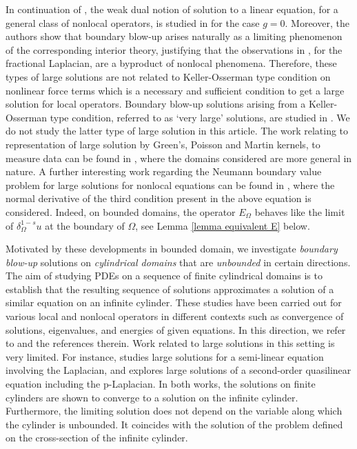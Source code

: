 \documentclass{amsart}
\begin{document}
In continuation of \cite{Abatangelo2015LargesHarmonic}, the weak dual notion of solution to a linear equation, for a general class of nonlocal operators, is studied in \cite{AbatangeloVazquez2023} for the case $g=0$. Moreover, the authors show that boundary blow-up arises naturally as a limiting phenomenon of the corresponding interior theory, justifying that the observations in \cite{Abatangelo2015LargesHarmonic}, for the fractional Laplacian, are a byproduct of nonlocal phenomena. Therefore, these types of large solutions are not related to Keller-Osserman type condition on nonlinear force terms which is a necessary and sufficient condition to get a large solution for local operators. 
Boundary blow-up solutions arising from a Keller-Osserman type condition, referred to as `very large' solutions, are studied in \cite{ChenFelmerQuass2015, Abaratgelo2017,Chowdhury2026}. We do not study the latter type of large solution in this article. The work relating to representation of large solution by Green's, Poisson and Martin kernels, to measure data can be found in \cite{BogdanKulczyckiMateusz2008, BogdanJarohsKania2020, HansenBogdan2025}, where the domains considered are more general in nature.  A further interesting work regarding the Neumann boundary value problem for large solutions for nonlocal equations can be found in \cite{Ros-OtonWeidner2026}, where the normal derivative of the third condition present in the above equation is considered. Indeed, on bounded domains, the operator $E_{\Omega}$ behaves like the limit of $\delta_{\Omega}^{1-s} u$ at the boundary of $\Omega$, see Lemma \ref{lemma equivalent E} below. 

\medskip

Motivated by these developments in bounded domain, we investigate \emph{boundary blow-up} solutions on \emph{cylindrical domains} that are \emph{unbounded} in certain directions.  The aim of studying PDEs on a sequence of finite cylindrical domains is to establish that the resulting sequence of solutions approximates a solution of a similar equation on an infinite cylinder. These studies have been carried out for various local and nonlocal operators in different contexts such as convergence of solutions, eigenvalues, and energies of given equations. In this direction, we refer to \cite{Chipotbook, ChipotRougirel2008, ChipotYeressian2008, ChowdhuryRoy2017} and the references therein. Work related to large solutions in this setting is very limited.
For instance, \cite{bandle2013large} studies large solutions for a semi-linear equation involving the Laplacian, and \cite{IndroDatta2025} explores large solutions of a second-order quasilinear equation  including the 
p-Laplacian. In both works, the solutions on finite cylinders are shown to converge to a solution on the infinite cylinder. Furthermore, the limiting solution does not depend on the variable along which the cylinder is unbounded. It coincides with the solution of the problem defined on the cross-section of the infinite cylinder.
\end{document}
